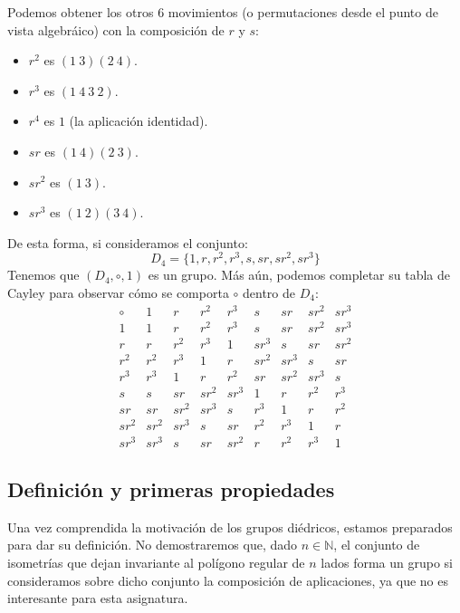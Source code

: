 \begin{ejemplo}
    Podemos obtener los otros 6 movimientos (o permutaciones desde el punto de vista algebráico) con la composición de $r$ y $s$:
    \begin{itemize}
        \item $r^2$ es $(1\ 3)(2\ 4)$.
        \item $r^3$ es $(1\ 4\ 3\ 2)$.
        \item $r^4$ es $1$ (la aplicación identidad).
        \item $sr$ es $(1\ 4)(2\ 3)$.
        \item $sr^2$ es $(1\ 3)$.
        \item $sr^3$ es $(1\ 2)(3\ 4)$.
    \end{itemize}
    De esta forma, si consideramos el conjunto:
    \begin{equation*}
        D_4 = \{1, r, r^2, r^3, s, sr, sr^2, sr^3\}
    \end{equation*}
    Tenemos que $(D_4,\circ,1)$ es un grupo. Más aún, podemos completar su tabla de Cayley para observar cómo se comporta $\circ$ dentro de $D_4$:
    \begin{equation*}
        \begin{array}{c|cccccccc}
             \circ & 1 & r & r^2 & r^3 & s & sr & sr^2 & sr^3 \\
             \hline
                1 & 1 & r & r^2 & r^3 & s & sr & sr^2 & sr^3 \\
                r & r & r^2 & r^3 & 1 & sr^3 & s & sr & sr^2 \\
                r^2 & r^2 & r^3 & 1 & r & sr^2 & sr^3 & s & sr \\
                r^3 & r^3 & 1 & r & r^2 & sr & sr^2 & sr^3 & s \\
                s & s & sr & sr^2 & sr^3 & 1 & r & r^2 & r^3 \\
                sr & sr & sr^2 & sr^3 & s & r^3 & 1 & r & r^2 \\
                sr^2 & sr^2 & sr^3 & s & sr & r^2 & r^3 & 1 & r \\
                sr^3 & sr^3 & s & sr & sr^2 & r & r^2 & r^3 & 1 
        \end{array}
    \end{equation*}
\end{ejemplo}

\subsection{Definición y primeras propiedades}
Una vez comprendida la motivación de los grupos diédricos, estamos preparados para dar su definición. No demostraremos que, dado $n\in \mathbb{N}$, el conjunto de isometrías que dejan invariante al polígono regular de $n$ lados forma un grupo si consideramos sobre dicho conjunto la composición de aplicaciones, ya que no es interesante para esta asignatura.

